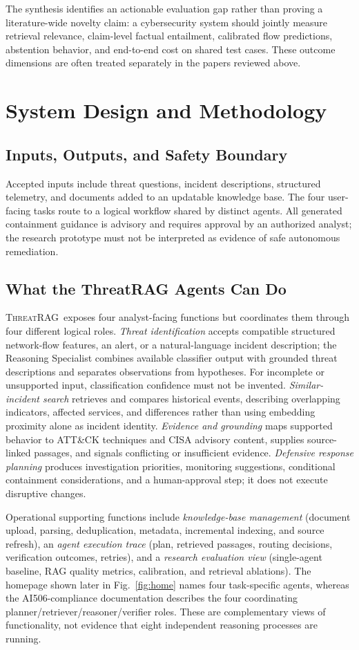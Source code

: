 \documentclass[journal,twoside]{IEEEtran}
\newcommand{\TR}{\textsc{ThreatRAG}}
\begin{document}
The synthesis identifies an actionable evaluation gap rather than proving a literature-wide novelty claim: a cybersecurity system should jointly measure retrieval relevance, claim-level factual entailment, calibrated flow predictions, abstention behavior, and end-to-end cost on shared test cases. These outcome dimensions are often treated separately in the papers reviewed above.

\section{System Design and Methodology}
\subsection{Inputs, Outputs, and Safety Boundary}
Accepted inputs include threat questions, incident descriptions, structured telemetry, and documents added to an updatable knowledge base. The four user-facing tasks route to a logical workflow shared by distinct agents. All generated containment guidance is advisory and requires approval by an authorized analyst; the research prototype must not be interpreted as evidence of safe autonomous remediation.

\subsection{What the ThreatRAG Agents Can Do}
\TR\ exposes four analyst-facing functions but coordinates them through four different logical roles. \emph{Threat identification} accepts compatible structured network-flow features, an alert, or a natural-language incident description; the Reasoning Specialist combines available classifier output with grounded threat descriptions and separates observations from hypotheses. For incomplete or unsupported input, classification confidence must not be invented. \emph{Similar-incident search} retrieves and compares historical events, describing overlapping indicators, affected services, and differences rather than using embedding proximity alone as incident identity. \emph{Evidence and grounding} maps supported behavior to ATT\&CK techniques and CISA advisory content, supplies source-linked passages, and signals conflicting or insufficient evidence. \emph{Defensive response planning} produces investigation priorities, monitoring suggestions, conditional containment considerations, and a human-approval step; it does not execute disruptive changes.

Operational supporting functions include \emph{knowledge-base management} (document upload, parsing, deduplication, metadata, incremental indexing, and source refresh), an \emph{agent execution trace} (plan, retrieved passages, routing decisions, verification outcomes, retries), and a \emph{research evaluation view} (single-agent baseline, RAG quality metrics, calibration, and retrieval ablations). The homepage shown later in Fig.~\ref{fig:home} names four task-specific agents, whereas the AI506-compliance documentation describes the four coordinating planner/retriever/reasoner/verifier roles. These are complementary views of functionality, not evidence that eight independent reasoning processes are running.
\end{document}
